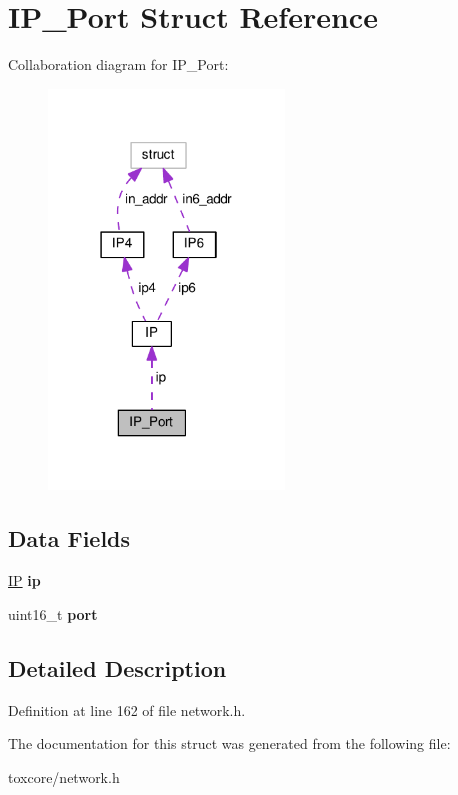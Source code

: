 \hypertarget{struct_i_p___port}{\section{I\+P\+\_\+\+Port Struct Reference}
\label{struct_i_p___port}
}


Collaboration diagram for I\+P\+\_\+\+Port\+:\nopagebreak
\begin{figure}[H]
\begin{center}
\leavevmode
\includegraphics[width=178pt]{struct_i_p___port__coll__graph}
\end{center}
\end{figure}
\subsection*{Data Fields}
\begin{DoxyCompactItemize}
\item 
\hypertarget{struct_i_p___port_a0c6193a337a223c63411b2fe722d79ec}{\hyperlink{struct_i_p}{I\+P} {\bfseries ip}}\label{struct_i_p___port_a0c6193a337a223c63411b2fe722d79ec}

\item 
\hypertarget{struct_i_p___port_a8e0798404bf2cf5dabb84c5ba9a4f236}{uint16\+\_\+t {\bfseries port}}\label{struct_i_p___port_a8e0798404bf2cf5dabb84c5ba9a4f236}

\end{DoxyCompactItemize}


\subsection{Detailed Description}


Definition at line 162 of file network.\+h.



The documentation for this struct was generated from the following file\+:\begin{DoxyCompactItemize}
\item 
toxcore/network.\+h\end{DoxyCompactItemize}
